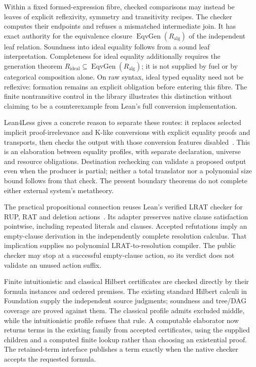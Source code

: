 \documentclass[11pt,a4paper]{article}
\newcommand{\code}[1]{\texttt{\detokenize{#1}}}
\begin{document}
Within a fixed formed-expression fibre, checked comparisons may instead be
leaves of explicit reflexivity, symmetry and transitivity recipes. The
checker computes their endpoints and refuses a mismatched intermediate
join. It has exact authority for the equivalence closure
$\operatorname{EqvGen}(R_{\mathrm{alg}})$ of the independent leaf relation.
Soundness into ideal equality follows from a sound leaf interpretation.
Completeness for ideal equality additionally requires the generation theorem
$R_{\mathrm{ideal}}\subseteq\operatorname{EqvGen}(R_{\mathrm{alg}})$; it is
not supplied by fuel or by categorical composition alone. On raw syntax,
ideal typed equality need not be reflexive: formation remains an explicit
obligation before entering this fibre. The finite nontransitive control in
the library illustrates this distinction without claiming to be a
counterexample from Lean's full conversion implementation.

Lean4Less gives a concrete reason to separate these routes: it replaces
selected implicit proof-irrelevance and K-like conversions with explicit
equality proofs and transports, then checks the output with those conversion
features disabled~\cite{Lean4Less}. This is an elaboration between equality
profiles, with separate declaration, universe and resource obligations.
Destination rechecking can validate a proposed output even when the producer
is partial; neither a total translator nor a polynomial size bound follows
from that check. The present boundary theorems do not complete either
external system's metatheory.

The practical propositional connection reuses Lean's verified LRAT checker
for RUP, RAT and deletion actions~\cite{LRAT}. Its adapter preserves native
clause satisfaction pointwise, including repeated literals and clauses.
Accepted refutations imply an empty-clause derivation in the independently
complete resolution calculus. That implication supplies no polynomial
LRAT-to-resolution compiler. The public checker may stop at a successful
empty-clause action, so its verdict does not validate an unused action suffix.

Finite intuitionistic and classical Hilbert certificates are checked directly
by their formula instances and ordered premises. The existing standard
Hilbert calculi in Foundation supply the independent source judgments;
soundness and tree/DAG coverage are proved against them. The classical
profile admits excluded middle, while the intuitionistic profile refuses
that rule. A computable elaborator now returns terms in the existing
\code{PropDeriv} family from accepted certificates, using the supplied
children and a computed finite lookup rather than choosing an existential
proof. The retained-term interface publishes a term exactly when the native
checker accepts the requested formula.
\end{document}
